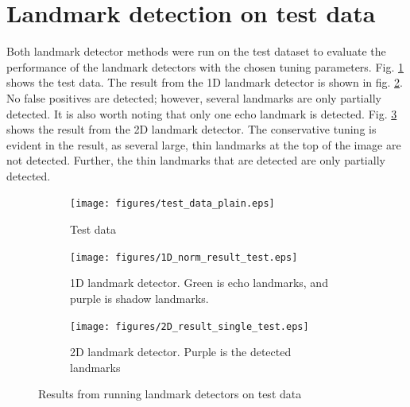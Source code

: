 \newpage

\section{Landmark detection on test data}

Both landmark detector methods were run on the test dataset to evaluate the performance of the landmark detectors with the chosen tuning parameters. Fig. \ref{fig:test_data} shows the test data. The result from the 1D landmark detector is shown in fig. \ref{fig:1D_norm_result_test}. No false positives are detected; however, several landmarks are only partially detected. It is also worth noting that only one echo landmark is detected. Fig. \ref{fig:2D_result_single_test} shows the result from the 2D landmark detector. The conservative tuning is evident in the result, as several large, thin landmarks at the top of the image are not detected. Further, the thin landmarks that are detected are only partially detected. 

\begin{figure} %
     \centering
    \begin{subfigure}[t]{0.66\textwidth}
         \centering
         \texttt{[image: figures/test\_data\_plain.eps]}
         \caption{Test data}
         \label{fig:test_data}
     \end{subfigure}
     \hfill
     \begin{subfigure}[b]{0.45\textwidth}
         \centering
         \texttt{[image: figures/1D\_norm\_result\_test.eps]}
         \caption{1D landmark detector. Green is echo landmarks, and purple is shadow landmarks.}
         \label{fig:1D_norm_result_test}
     \end{subfigure}
     \hfill
     \begin{subfigure}[b]{0.45\textwidth}
         \centering
         \texttt{[image: figures/2D\_result\_single\_test.eps]}
         \caption{2D landmark detector. Purple is the detected landmarks}
         \label{fig:2D_result_single_test}
     \end{subfigure}
        \caption{Results from running landmark detectors on test data}
        \label{fig:landmark_detection_test_data}
\end{figure}
